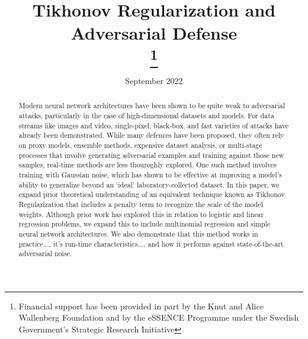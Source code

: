 \documentclass[conference]{IEEEtran}
\date{September 2022}
\begin{document}
\title{Tikhonov Regularization and Adversarial Defense\\

\thanks{Financial support has been provided in part by the Knut and Alice Wallenberg Foundation and by the eSSENCE Programme under the Swedish Government’s Strategic Research Initiative}
}

\author{
\and
{}
\and
{}
}


\maketitle


\begin{abstract}
    Modern neural network architectures have been shown to be quite weak to adversarial attacks, particularly in the case of high-dimensional datasets and models. For data streams like images and video, single-pixel, black-box, and fast varieties of attacks have already been demonstrated. While many defences have been proposed, they often rely on proxy models, ensemble methods, expensive dataset analysis, or multi-stage processes that involve generating adversarial examples and training against those new samples, real-time methods are less thouroghly explored. One such method involves training with Gaussian noise, which has shown to be effective at improving a model's ability to generalize beyond an `ideal' laboratory-collected dataset. In this paper, we expand prior theoretical understanding of an equivalent technique known as Tikhonov Regularization that includes a penalty term to recognize the scale of the model weights. Although prior work has explored this in relation to logistic and linear regression problems, we expand this to include multinomial regression and simple neural network architectures. We also demonstrate that this method works in practice..., it's run-time characteristics..., and how it performs against state-of-the-art adversarial noise.
\end{abstract}
\end{document}
